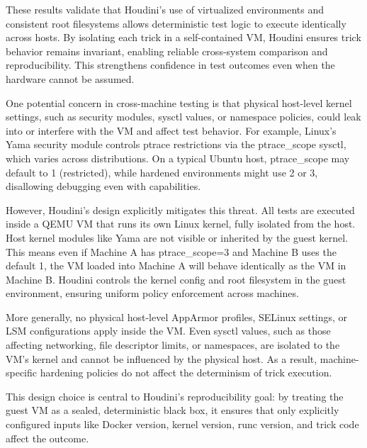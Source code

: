 \begin{doublespace}
These results validate that Houdini’s use of virtualized environments and consistent root filesystems allows deterministic test logic to execute identically across hosts. By isolating each trick in a self-contained VM, Houdini ensures trick behavior remains invariant, enabling reliable cross-system comparison and reproducibility. This strengthens confidence in test outcomes even when the hardware cannot be assumed.

One potential concern in cross-machine testing is that physical host-level kernel settings, such as security modules, sysctl values, or namespace policies, could leak into or interfere with the VM and affect test behavior. For example, Linux’s Yama security module controls ptrace restrictions via the ptrace\_scope sysctl, which varies across distributions. On a typical Ubuntu host, ptrace\_scope may default to 1 (restricted), while hardened environments might use 2 or 3, disallowing debugging even with capabilities.

However, Houdini’s design explicitly mitigates this threat. All tests are executed inside a QEMU VM that runs its own Linux kernel, fully isolated from the host. Host kernel modules like Yama are not visible or inherited by the guest kernel. This means even if Machine A has ptrace\_scope=3 and Machine B uses the default 1, the VM loaded into Machine A will behave identically as the VM in Machine B. Houdini controls the kernel config and root filesystem in the guest environment, ensuring uniform policy enforcement across machines.

More generally, no physical host-level AppArmor profiles, SELinux settings, or LSM configurations apply inside the VM. Even sysctl values, such as those affecting networking, file descriptor limits, or namespaces, are isolated to the VM’s kernel and cannot be influenced by the physical host. As a result, machine-specific hardening policies do not affect the determinism of trick execution.

This design choice is central to Houdini’s reproducibility goal: by treating the guest VM as a sealed, deterministic black box, it ensures that only explicitly configured inputs like Docker version, kernel version, runc version, and trick code affect the outcome.

































\end{doublespace}

